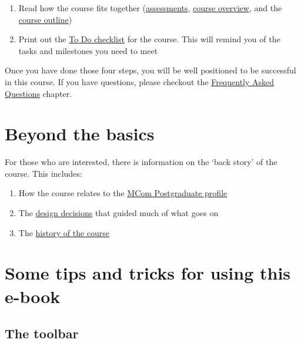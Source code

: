 \documentclass[]{book}
\providecommand{\tightlist}{%
  \setlength{\itemsep}{0pt}\setlength{\parskip}{0pt}}
\theoremstyle{definition}
\theoremstyle{definition}
\theoremstyle{definition}
\theoremstyle{remark}
\begin{document}
\begin{enumerate}
\def\labelenumi{\arabic{enumi}.}
\tightlist
\item
  Read how the course fits together
  (\protect\hyperlink{assessment-overview}{assessments},
  \protect\hyperlink{course-overview}{course overview}, and the
  \protect\hyperlink{course-outline}{course outline})
\item
  Print out the \protect\hyperlink{todo-checklist}{To Do checklist} for
  the course. This will remind you of the tasks and milestones you need
  to meet
\end{enumerate}

Once you have done those four steps, you will be well positioned to be
successful in this course. If you have questions, please checkout the
\protect\hyperlink{faq}{Frequently Asked Questions} chapter.

\hypertarget{beyond-the-basics}{%
\section*{Beyond the basics}\label{beyond-the-basics}}

For those who are interested, there is information on the `back story'
of the course. This includes:

\begin{enumerate}
\def\labelenumi{\arabic{enumi}.}
\tightlist
\item
  How the course relates to the \protect\hyperlink{profile}{MCom
  Postgraduate profile}
\item
  The \protect\hyperlink{course-design}{design decisions} that guided
  much of what goes on
\item
  The \protect\hyperlink{course-history}{history of the course}
\end{enumerate}

\hypertarget{some-tips-and-tricks-for-using-this-e-book}{%
\section*{Some tips and tricks for using this
e-book}\label{some-tips-and-tricks-for-using-this-e-book}}

\hypertarget{the-toolbar}{%
\subsection*{The toolbar}\label{the-toolbar}}
\end{document}
